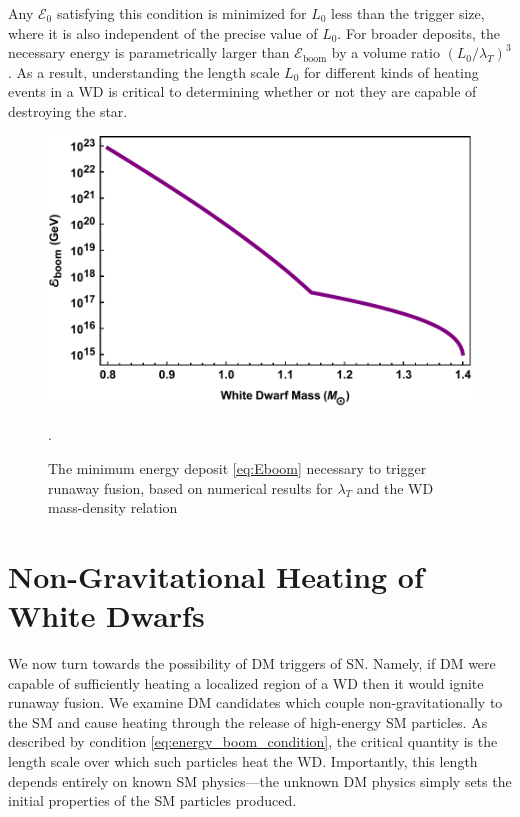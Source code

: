 \documentclass[twocolumn, preprintnumbers,amsmath,amssymb,prd, superscriptaddress]{revtex4}
\newcommand{\Ez}{\mathcal{E}_0}
\newcommand{\Eboom}{\mathcal{E}_\text{boom}}
\begin{document}
Any $\Ez$ satisfying this condition is minimized for $L_0$ less than the trigger size, where it is also independent of the precise value of $L_0$.
For broader deposits, the necessary energy is parametrically larger than $\Eboom$ by a volume ratio $(L_0/\lambda_T)^3$.
As a result, understanding the length scale $L_0$ for different kinds of heating events in a WD is critical to determining whether or not they are capable of destroying the star.
\begin{figure}
\includegraphics[scale=.45]{Eboom.pdf}
\caption{The minimum energy deposit \eqref{eq:Eboom} necessary to trigger runaway fusion, based on numerical results for $\lambda_T$ \cite{Woosley} and the WD mass-density relation \cite{cococubed}}.
\label{fig:Eboom}
\end{figure}

\section{Non-Gravitational Heating of White Dwarfs}
\label{sec:SMHeating}

We now turn towards the possibility of DM triggers of SN. 
Namely, if DM were capable of sufficiently heating a localized region of a WD then it would ignite runaway fusion.
We examine DM candidates which couple non-gravitationally to the SM and cause heating through the release of high-energy SM particles. 
As described by condition \eqref{eq:energy_boom_condition}, the critical quantity is the length scale over which such particles heat the WD. 
Importantly, this length depends entirely on known SM physics---the unknown DM physics simply sets the initial properties of the SM particles produced. 
\end{document}
